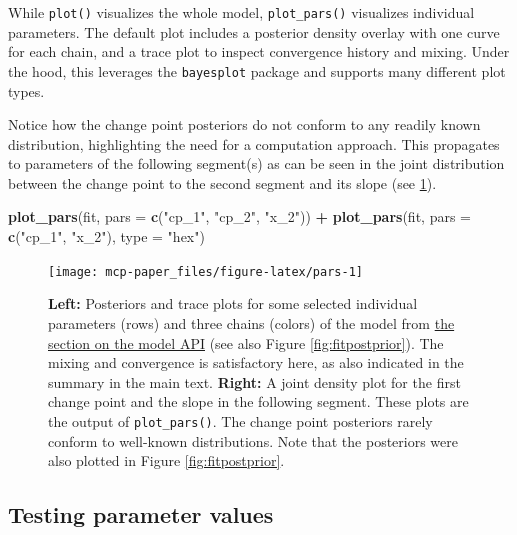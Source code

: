 \documentclass[
  american,
]{article}
\newenvironment{Shaded}{\begin{snugshade}}{\end{snugshade}}
\newcommand{\DataTypeTok}[1]{\textcolor[rgb]{0.13,0.29,0.53}{#1}}
\newcommand{\KeywordTok}[1]{\textcolor[rgb]{0.13,0.29,0.53}{\textbf{#1}}}
\newcommand{\NormalTok}[1]{#1}
\newcommand{\OperatorTok}[1]{\textcolor[rgb]{0.81,0.36,0.00}{\textbf{#1}}}
\newcommand{\StringTok}[1]{\textcolor[rgb]{0.31,0.60,0.02}{#1}}
\begin{document}
While \texttt{plot()} visualizes the whole model, \texttt{plot\_pars()} visualizes individual parameters. The default plot includes a posterior density overlay with one curve for each chain, and a trace plot to inspect convergence history and mixing. Under the hood, this leverages the \texttt{bayesplot} package \citep{gabry2019} and supports many different plot types.

Notice how the change point posteriors do not conform to any readily known distribution, highlighting the need for a computation approach. This propagates to parameters of the following segment(s) as can be seen in the joint distribution between the change point to the second segment and its slope (see \ref{fig:pars}).

\begin{Shaded}
\begin{Highlighting}[]
\KeywordTok{plot_pars}\NormalTok{(fit, }\DataTypeTok{pars =} \KeywordTok{c}\NormalTok{(}\StringTok{"cp_1"}\NormalTok{, }\StringTok{"cp_2"}\NormalTok{, }\StringTok{"x_2"}\NormalTok{)) }\OperatorTok{+}\StringTok{ }
\StringTok{  }\KeywordTok{plot_pars}\NormalTok{(fit, }\DataTypeTok{pars =} \KeywordTok{c}\NormalTok{(}\StringTok{"cp_1"}\NormalTok{, }\StringTok{"x_2"}\NormalTok{), }\DataTypeTok{type =} \StringTok{"hex"}\NormalTok{)}
\end{Highlighting}
\end{Shaded}

\begin{figure}
\texttt{[image: mcp-paper\_files/figure-latex/pars-1]} \caption{\textbf{Left:} Posteriors and trace plots for some selected individual parameters (rows) and three chains (colors) of the model from \protect\hyperlink{segments_api}{the section on the model API} (see also Figure \ref{fig:fitpostprior}). The mixing and convergence is satisfactory here, as also indicated in the summary in the main text. \textbf{Right:} A joint density plot for the first change point and the slope in the following segment. These plots are the output of \texttt{plot\_pars()}. The change point posteriors rarely conform to well-known distributions. Note that the posteriors were also plotted in Figure \ref{fig:fitpostprior}.}\label{fig:pars}
\end{figure}



\hypertarget{testing-parameter-values}{%
\subsection{Testing parameter values}\label{testing-parameter-values}}
\end{document}
